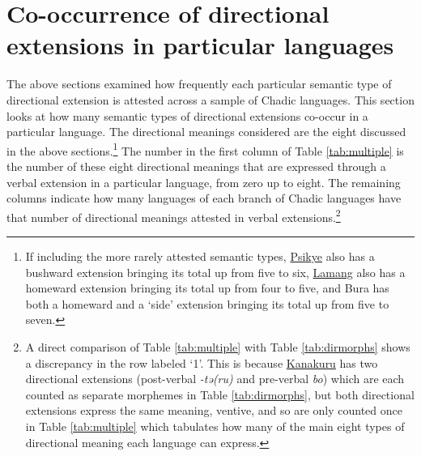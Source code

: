 \section{Co-occurrence of directional extensions in particular languages} \label{sec:co-occurrence}

The above sections examined how frequently each particular semantic type of directional extension is attested across a sample of Chadic languages. This section looks at how many semantic types of directional extensions co-occur in a particular language. The directional meanings considered are the eight discussed in the above sections.\footnote{If including the more rarely attested semantic types, \hyperref[psik]{Psikye} also has a bushward extension bringing its total up from five to six, \hyperref[lama]{Lamang} also has a homeward extension bringing its total up from four to five, and Bura has both a homeward and a `side' extension bringing its total up from five to seven. } The number in the first column of Table \ref{tab:multiple} is the number of these eight directional meanings that are expressed through a verbal extension in a particular language, from zero up to eight. The remaining columns indicate how many languages of each branch of Chadic languages have that number of directional meanings attested in verbal extensions.\footnote{A direct comparison of Table \ref{tab:multiple} with Table \ref{tab:dirmorphs} shows a discrepancy in the row labeled `1'. This is because \hyperref[kana]{Kanakuru} has two directional extensions (post-verbal \textit{-tə(ru)} and pre-verbal \textit{bo}) which are each counted as separate morphemes in Table \ref{tab:dirmorphs}, but both directional extensions express the same meaning, ventive, and so are only counted once in Table \ref{tab:multiple} which tabulates how many of the main eight types of directional meaning each language can express.} 

